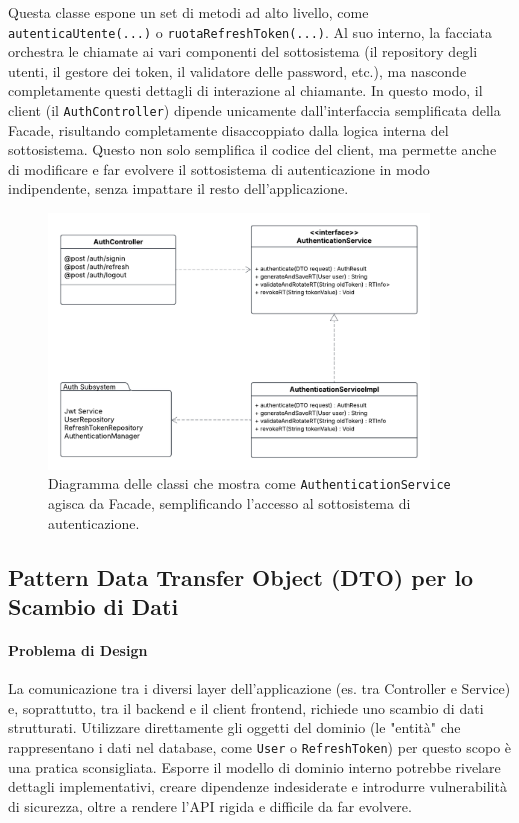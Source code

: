 \documentclass[12pt,a4paper,openright,twoside]{book}
\begin{document}
Questa classe espone un set di metodi ad alto livello, come \texttt{autentica\allowbreak Utente\allowbreak (...)} o \texttt{ruota\allowbreak Refresh\allowbreak Token\allowbreak (...)}. Al suo interno, la facciata orchestra le chiamate ai vari componenti del sottosistema (il repository degli utenti, il gestore dei token, il validatore delle password, etc.), ma nasconde completamente questi dettagli di interazione al chiamante. In questo modo, il client (il \texttt{Auth\allowbreak Controller}) dipende unicamente dall'interfaccia semplificata della Facade, risultando completamente disaccoppiato dalla logica interna del sottosistema. Questo non solo semplifica il codice del client, ma permette anche di modificare e far evolvere il sottosistema di autenticazione in modo indipendente, senza impattare il resto dell'applicazione.

\begin{figure}[htbp]
    \centering
    \includegraphics[width=0.9\textwidth]{figures/facade.pdf}
    \caption{Diagramma delle classi che mostra come \texttt{AuthenticationService} agisca da Facade, semplificando l'accesso al sottosistema di autenticazione.}
    \label{fig:facade_uml}
\end{figure}

\FloatBarrier

\subsection{Pattern Data Transfer Object (DTO) per lo Scambio di Dati}
\label{subsec:design_dto}

\paragraph{Problema di Design}
La comunicazione tra i diversi layer dell'applicazione (es. tra Controller e Service) e, soprattutto, tra il backend e il client frontend, richiede uno scambio di dati strutturati. Utilizzare direttamente gli oggetti del dominio (le "entità" che rappresentano i dati nel database, come \texttt{User} o \texttt{RefreshToken}) per questo scopo è una pratica sconsigliata. Esporre il modello di dominio interno potrebbe rivelare dettagli implementativi, creare dipendenze indesiderate e introdurre vulnerabilità di sicurezza, oltre a rendere l'API rigida e difficile da far evolvere.
\end{document}
